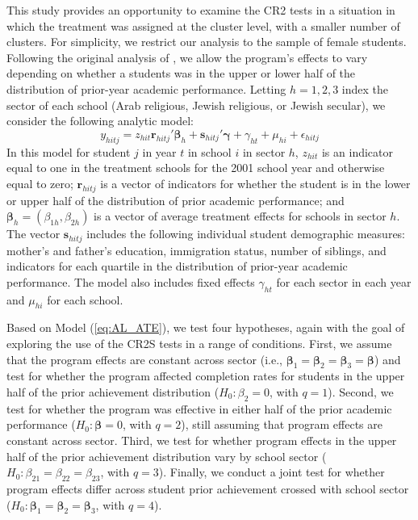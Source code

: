 \documentclass[12pt]{article}\usepackage[]{graphicx}\usepackage[]{color}
\newcommand{\bm}{\mathbf}
\newcommand{\bs}{\boldsymbol}
\begin{document}
This study provides an opportunity to examine the CR2 tests in a situation in which the treatment was assigned at the cluster level, with a smaller number of clusters.
For simplicity, we restrict our analysis to the sample of female students.
Following the original analysis of \citet{Angrist2009effects}, we allow the program's effects to vary depending on whether a students was in the upper or lower half of the distribution of prior-year academic performance. 
Letting $h = 1,2,3$ index the sector of each school (Arab religious, Jewish religious, or Jewish secular), we consider the following analytic model: 
\begin{equation}
\label{eq:AL_ATE}
y_{hitj} = z_{hit}\bm{r}_{hitj}'\bs\beta_h + \bm{s}_{hitj}'\bs\gamma + \gamma_{ht} + \mu_{hi} + \epsilon_{hitj}
\end{equation}
In this model for student $j$ in year $t$ in school $i$ in sector $h$, $z_{hit}$ is an indicator equal to one in the treatment schools for the 2001 school year and otherwise equal to zero; $\bm{r}_{hitj}$ is a vector of indicators for whether the student is in the lower or upper half of the distribution of prior academic performance; and $\bs\beta_h = \left(\beta_{1h}, \beta_{2h}\right)$ is a vector of average treatment effects for schools in sector $h$. 
The vector $\bm{s}_{hitj}$ includes the following individual student demographic measures: mother's and father's education, immigration status, number of siblings, and indicators for each quartile in the distribution of prior-year academic performance. 
The model also includes fixed effects $\gamma_{ht}$ for each sector in each year and $\mu_{hi}$ for each school. 

Based on Model (\ref{eq:AL_ATE}), we test four hypotheses, again with the goal of exploring the use of the CR2S tests in a range of conditions. 
First, we assume that the program effects are constant across sector (i.e., $\bs\beta_1 = \bs\beta_2 = \bs\beta_3 = \bs\beta$) and test for whether the program affected completion rates for students in the upper half of the prior achievement distribution ($H_0: \beta_2 = 0$, with $q = 1$).
Second, we test for whether the program was effective in either half of the prior academic performance ($H_0: \bs\beta = 0$, with $q = 2$), still assuming that program effects are constant across sector. 
Third, we test for whether program effects in the upper half of the prior achievement distribution vary by school sector ($H_0: \beta_{21} = \beta_{22} = \beta_{23}$, with $q = 3$). 
Finally, we conduct a joint test for whether program effects differ across student prior achievement crossed with school sector ($H_0: \bs\beta_1 = \bs\beta_2 = \bs\beta_3$, with $q = 4$). 
\end{document}
